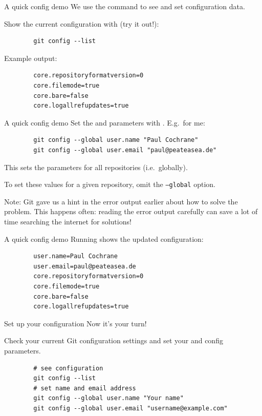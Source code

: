 \begin{frame}[fragile]{A quick config demo}
    We use the  command to see and set configuration data.

    Show the current configuration with (try it out!):
    \begin{verbatim}
        git config --list
    \end{verbatim}

    Example output:
    \begin{verbatim}
        core.repositoryformatversion=0
        core.filemode=true
        core.bare=false
        core.logallrefupdates=true
    \end{verbatim}
\end{frame}

\begin{frame}[fragile]{A quick config demo}
    Set the  and  parameters with .  E.g.\ for me:
    \begin{verbatim}
        git config --global user.name "Paul Cochrane"
        git config --global user.email "paul@peateasea.de"
    \end{verbatim}

    This sets the parameters for all repositories (i.e.\ globally).

    To set these values for a given repository, omit the
    \texttt{--global} option.

    Note: Git gave us a hint in the error output earlier about how to solve
    the problem.  This happens often: reading the error output carefully can
    save a lot of time searching the internet for solutions!
\end{frame}

\begin{frame}[fragile]{A quick config demo}
    Running  shows the updated configuration:
    \begin{verbatim}
        user.name=Paul Cochrane
        user.email=paul@peateasea.de
        core.repositoryformatversion=0
        core.filemode=true
        core.bare=false
        core.logallrefupdates=true
    \end{verbatim}
\end{frame}

\begin{frame}[fragile]{Set up your configuration}
    Now it's your turn!

    Check your current Git configuration settings and set your
     and  config parameters.

    \begin{verbatim}
        # see configuration
        git config --list
        # set name and email address
        git config --global user.name "Your name"
        git config --global user.email "username@example.com"
    \end{verbatim}
\end{frame}

